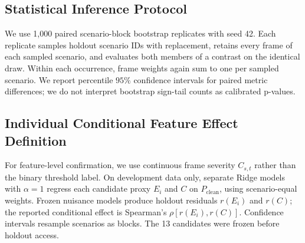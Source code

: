 \subsection{Statistical Inference Protocol}
We use 1,000 paired scenario-block bootstrap replicates with seed 42. Each replicate samples holdout scenario IDs with replacement, retains every frame of each sampled scenario, and evaluates both members of a contrast on the identical draw. Within each occurrence, frame weights again sum to one per sampled scenario. We report percentile $95\%$ confidence intervals for paired metric differences; we do not interpret bootstrap sign-tail counts as calibrated p-values.

\subsection{Individual Conditional Feature Effect Definition}
For feature-level confirmation, we use continuous frame severity $C_{s,t}$ rather than the binary threshold label. On development data only, separate Ridge models with $\alpha=1$ regress each candidate proxy $E_i$ and $C$ on $P_{\mathrm{clean}}$, using scenario-equal weights. Frozen nuisance models produce holdout residuals $r(E_i)$ and $r(C)$; the reported conditional effect is Spearman's $\rho[r(E_i), r(C)]$. Confidence intervals resample scenarios as blocks. The 13 candidates were frozen before holdout access.
